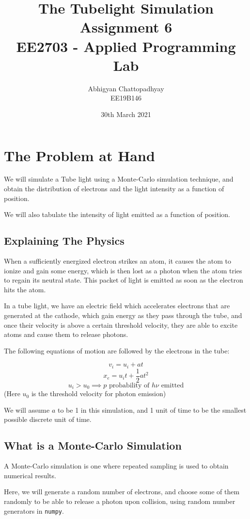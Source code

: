 \documentclass[12pt]{article}
\title{\vspace{-1cm}The Tubelight Simulation\\
\large Assignment 6\\
\large EE2703 - Applied Programming Lab}
\author{Abhigyan Chattopadhyay \\
EE19B146}
\date{30th March 2021}
\begin{document}
\maketitle
\tableofcontents
\pagebreak
\section{The Problem at Hand}
We will simulate a Tube light using a Monte-Carlo simulation technique, and obtain the distribution of electrons and the light intensity as a function of position. 

We will also tabulate the intensity of light emitted as a function of position.

\subsection{Explaining The Physics}
When a sufficiently energized electron strikes an atom, it causes the atom to ionize and gain some energy, which is then lost as a photon when the atom tries to regain its neutral state. This packet of light is emitted as soon as the electron hits the atom.

In a tube light, we have an electric field which accelerates electrons that are generated at the cathode, which gain energy as they pass through the tube, and once their velocity is above a certain threshold velocity, they are able to excite atoms and cause them to release photons.

The following equations of motion are followed by the electrons in the tube:

$$v_i = u_i + at$$
$$x_e = u_i t + \frac{1}{2} a t^2$$
$$u_i>u_0 \implies p\text{ probability of } h\nu \text{ emitted}$$
(Here $u_0$ is the threshold velocity for photon emission)

We will assume $a$ to be 1 in this simulation, and 1 unit of time to be the smallest possible discrete unit of time.

\subsection{What is a Monte-Carlo Simulation}

A Monte-Carlo simulation is one where repeated sampling is used to obtain numerical results.

Here, we will generate a random number of electrons, and choose some of them randomly to be able to release a photon upon collision, using random number generators in \texttt{numpy}.
\end{document}
